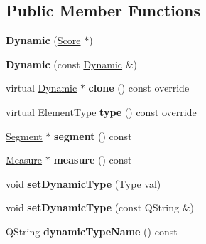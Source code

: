 \subsection*{Public Member Functions}
\begin{DoxyCompactItemize}
\item 
\mbox{\label{class_ms_1_1_dynamic_a1a569deccefc228fe31d30f8ee0275ef}} 
{\bfseries Dynamic} (\hyperlink{class_ms_1_1_score}{Score} $\ast$)
\item 
\mbox{\label{class_ms_1_1_dynamic_a71b43a22b2d0d4266414d3155ba8275f}} 
{\bfseries Dynamic} (const \hyperlink{class_ms_1_1_dynamic}{Dynamic} \&)
\item 
\mbox{\label{class_ms_1_1_dynamic_a4ac7baebf08c47f062425f0e694619c9}} 
virtual \hyperlink{class_ms_1_1_dynamic}{Dynamic} $\ast$ {\bfseries clone} () const override
\item 
\mbox{\label{class_ms_1_1_dynamic_a42704ec78e71da22fb5ad2ddc0f85b34}} 
virtual Element\+Type {\bfseries type} () const override
\item 
\mbox{\label{class_ms_1_1_dynamic_a542021b8b5ea532177a3e9f6c60ed4e0}} 
\hyperlink{class_ms_1_1_segment}{Segment} $\ast$ {\bfseries segment} () const
\item 
\mbox{\label{class_ms_1_1_dynamic_a2512ebb9ea455994eacc8008693740e0}} 
\hyperlink{class_ms_1_1_measure}{Measure} $\ast$ {\bfseries measure} () const
\item 
\mbox{\label{class_ms_1_1_dynamic_a04a04f107f61c2dbe7e779762d5d7bfc}} 
void {\bfseries set\+Dynamic\+Type} (Type val)
\item 
\mbox{\label{class_ms_1_1_dynamic_ab8eb017e1206204a43e8e8dff4a6b53d}} 
void {\bfseries set\+Dynamic\+Type} (const Q\+String \&)
\item 
\mbox{\label{class_ms_1_1_dynamic_afc9d5cb32c4e5b2723f827c46514e527}} 
Q\+String {\bfseries dynamic\+Type\+Name} () const
\item 
\mbox{\label{class_ms_1_1_dynamic_aed71c5ad24e4744c6e3993761411a8c2}} 

\end{DoxyCompactItemize}
